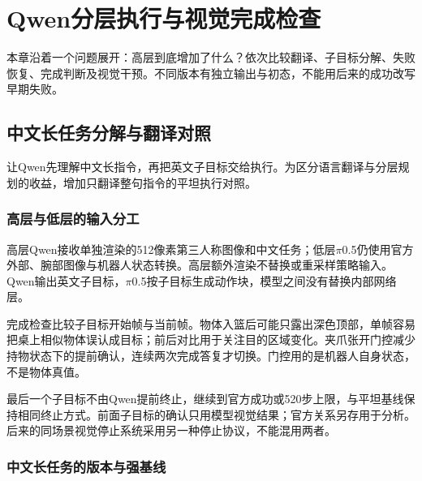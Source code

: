\chapter{Qwen分层执行与视觉完成检查}

本章沿着一个问题展开：高层到底增加了什么？依次比较翻译、子目标分解、失败恢复、完成判断及视觉干预。不同版本有独立输出与初态，不能用后来的成功改写早期失败。

\section{中文长任务分解与翻译对照}

\label{stage:s09}

让Qwen先理解中文长指令，再把英文子目标交给\pifive{}执行。为区分语言翻译与分层规划的收益，增加只翻译整句指令的平坦执行对照。

\subsection{高层与低层的输入分工}\label{s09-detail-1}

高层Qwen接收单独渲染的512像素第三人称图像和中文任务；低层\(\pi\)0.5仍使用官方外部、腕部图像与机器人状态转换。高层额外渲染不替换或重采样策略输入。Qwen输出英文子目标，\(\pi\)0.5按子目标生成动作块，模型之间没有替换内部网络层。

完成检查比较子目标开始帧与当前帧。物体入篮后可能只露出深色顶部，单帧容易把桌上相似物体误认成目标；前后对比用于关注目的区域变化。夹爪张开门控减少持物状态下的提前确认，连续两次完成答复才切换。门控用的是机器人自身状态，不是物体真值。

最后一个子目标不由Qwen提前终止，继续到官方成功或520步上限，与平坦基线保持相同终止方式。前面子目标的确认只用模型视觉结果；官方关系另存用于分析。后来的同场景视觉停止系统采用另一种停止协议，不能混用两者。

\subsection{中文长任务的版本与强基线}\label{s09-detail-2}

